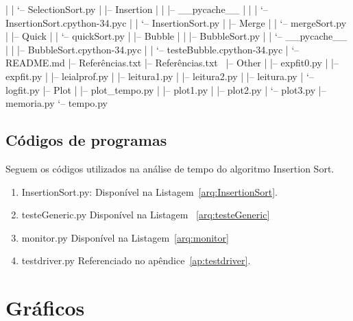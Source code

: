 \documentclass[12pt,a4paper,twoside]{report}
\begin{document}
\begin{terminal}
|   |   `-- SelectionSort.py
|   |-- Insertion
|   |   |-- __pycache__
|   |   |   `-- InsertionSort.cpython-34.pyc
|   |   `-- InsertionSort.py
|   |-- Merge
|   |   `-- mergeSort.py
|   |-- Quick
|   |   `-- quickSort.py
|   |-- Bubble
|   |   |-- BubbleSort.py
|   |   `-- __pycache__
|   |       |-- BubbleSort.cpython-34.pyc
|   |       `-- testeBubble.cpython-34.pyc
|   `-- README.md
|-- Referências.txt
|-- Referências.txt~
|-- Other
|   |-- expfit0.py
|   |-- expfit.py
|   |-- leialprof.py
|   |-- leitura1.py
|   |-- leitura2.py
|   |-- leitura.py
|   `-- logfit.py
|-- Plot
|   |-- plot_tempo.py
|   |-- plot1.py
|   |-- plot2.py
|   `-- plot3.py
|-- memoria.py
`-- tempo.py



\end{terminal}

\section{Códigos de programas}
Seguem os códigos utilizados na análise de tempo do algoritmo Insertion Sort.
\begin{enumerate}

\item InsertionSort.py:
Disponível na Listagem~\ref{arq:InsertionSort}.


\item testeGeneric.py
Disponível na Listagem ~\ref{arq:testeGeneric}


\item monitor.py
Disponível na Listagem~\ref{arq:monitor}



\item testdriver.py
 Referenciado no apêndice~\ref{ap:testdriver}.
\end{enumerate}


\chapter{Gráficos}
\end{document}

